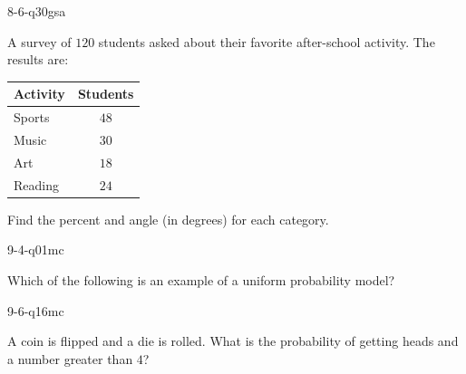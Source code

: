 \begin{practiceQuestion}{8-6-q30}{gsa}
\begin{questionText}
A survey of $120$ students asked about their favorite after-school activity. The results are:

\begin{center}
\begin{tabular}{|l|c|}
\hline
\textbf{Activity} & \textbf{Students} \\
\hline
Sports & $48$ \\
\hline
Music & $30$ \\
\hline
Art & $18$ \\
\hline
Reading & $24$ \\
\hline
\end{tabular}
\end{center}

Find the percent and angle (in degrees) for each category.
\end{questionText}
\end{practiceQuestion}

\begin{practiceQuestion}{9-4-q01}{mc}
\begin{questionText}
Which of the following is an example of a uniform probability model?
\end{questionText}
\end{practiceQuestion}

\begin{practiceQuestion}{9-6-q16}{mc}
\begin{questionText}
A coin is flipped and a die is rolled. What is the probability of getting heads and a number greater than $4$?
\end{questionText}
\end{practiceQuestion}

